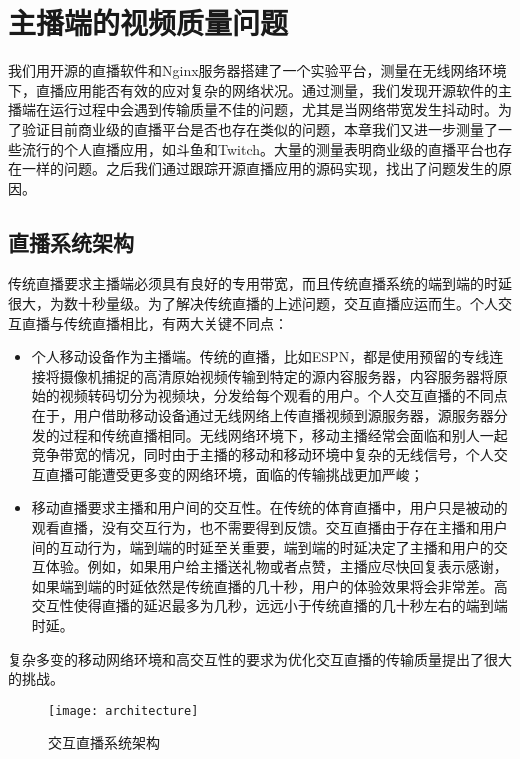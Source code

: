 \chapter{主播端的视频质量问题}
我们用开源的直播软件和Nginx服务器搭建了一个实验平台，测量在无线网络环境下，直播应用能否有效的应对复杂的网络状况。通过测量，我们发现开源软件的主播端在运行过程中会遇到传输质量不佳的问题，尤其是当网络带宽发生抖动时。为了验证目前商业级的直播平台是否也存在类似的问题，本章我们又进一步测量了一些流行的个人直播应用，如斗鱼和Twitch。大量的测量表明商业级的直播平台也存在一样的问题。之后我们通过跟踪开源直播应用的源码实现，找出了问题发生的原因。

\section{直播系统架构}
传统直播要求主播端必须具有良好的专用带宽，而且传统直播系统的端到端的时延很大，为数十秒量级。为了解决传统直播的上述问题，交互直播应运而生。个人交互直播与传统直播相比，有两大关键不同点：
\begin{itemize}
\item 个人移动设备作为主播端。传统的直播，比如ESPN，都是使用预留的专线连接将摄像机捕捉的高清原始视频传输到特定的源内容服务器，内容服务器将原始的视频转码切分为视频块，分发给每个观看的用户。个人交互直播的不同点在于，用户借助移动设备通过无线网络上传直播视频到源服务器，源服务器分发的过程和传统直播相同。无线网络环境下，移动主播经常会面临和别人一起竞争带宽的情况，同时由于主播的移动和移动环境中复杂的无线信号，个人交互直播可能遭受更多变的网络环境，面临的传输挑战更加严峻；
\item 移动直播要求主播和用户间的交互性。在传统的体育直播中，用户只是被动的观看直播，没有交互行为，也不需要得到反馈。交互直播由于存在主播和用户间的互动行为，端到端的时延至关重要，端到端的时延决定了主播和用户的交互体验。例如，如果用户给主播送礼物或者点赞，主播应尽快回复表示感谢，如果端到端的时延依然是传统直播的几十秒，用户的体验效果将会非常差。高交互性使得直播的延迟最多为几秒，远远小于传统直播的几十秒左右的端到端时延。
\end{itemize}

复杂多变的移动网络环境和高交互性的要求为优化交互直播的传输质量提出了很大的挑战。

\begin{figure}[h]%
  \centering
  \texttt{[image: architecture]}
  \caption{交互直播系统架构}
  \label{fig:architecture}
\end{figure}


